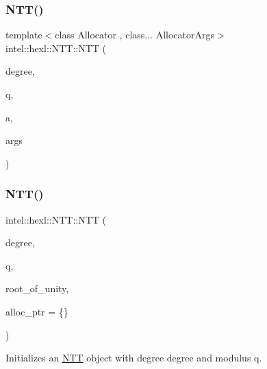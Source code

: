 \subsubsection{\texorpdfstring{N\+T\+T()}{NTT()}\hspace{0.1cm}{\footnotesize\ttfamily [3/5]}}
{\footnotesize\ttfamily template$<$class Allocator , class... Allocator\+Args$>$ \\
intel\+::hexl\+::\+N\+T\+T\+::\+N\+TT (\begin{DoxyParamCaption}\item[{uint64\+\_\+t}]{degree,  }\item[{uint64\+\_\+t}]{q,  }\item[{Allocator \&\&}]{a,  }\item[{Allocator\+Args \&\&...}]{args }\end{DoxyParamCaption})\hspace{0.3cm}{\ttfamily [inline]}}

\mbox{\label{classintel_1_1hexl_1_1NTT_ac5ef577bf39789c1e200b7d5a7b65989}} 
\subsubsection{\texorpdfstring{N\+T\+T()}{NTT()}\hspace{0.1cm}{\footnotesize\ttfamily [4/5]}}
{\footnotesize\ttfamily intel\+::hexl\+::\+N\+T\+T\+::\+N\+TT (\begin{DoxyParamCaption}\item[{uint64\+\_\+t}]{degree,  }\item[{uint64\+\_\+t}]{q,  }\item[{uint64\+\_\+t}]{root\+\_\+of\+\_\+unity,  }\item[{std\+::shared\+\_\+ptr$<$ \hyperlink{structintel_1_1hexl_1_1AllocatorBase}{Allocator\+Base} $>$}]{alloc\+\_\+ptr = {\ttfamily \{\}} }\end{DoxyParamCaption})}



Initializes an \hyperlink{classintel_1_1hexl_1_1NTT}{N\+TT} object with degree {\ttfamily degree} and modulus {\ttfamily q}. 


